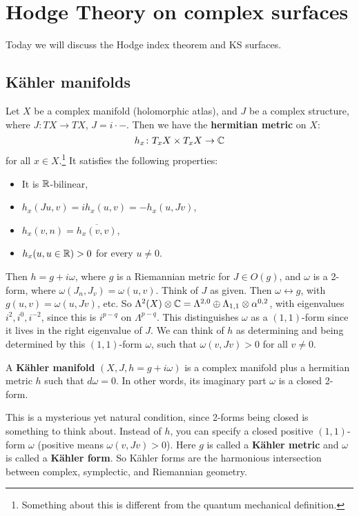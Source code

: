 \section{Hodge Theory on complex surfaces} 
Today we will discuss the Hodge index theorem and KS surfaces.
\subsection{K\"ahler manifolds}
Let $X$ be a complex manifold (holomorphic atlas), and $J$ be a complex structure, where $J \colon TX \to TX$, $J = i \cdot -$. Then we have the \textbf{hermitian metric} on $X:$ \[
h_x \colon T_x X \times T_x X \to \mathbb{C}
\] for all $x \in X$.\footnote{Something about this is different from the quantum mechanical definition.} It satisfies the following properties:
\begin{itemize}
\setlength\itemsep{-.2em}
    \item It is $\mathbb{R}$-bilinear,
    \item $h_x(Ju,v) = ih_x(u,v) = -h_x(u,Jv)$,
    \item $h_x(v,n) =  \overline{h_x(v,v)}$,
    \item $h_x(u,u \in \mathbb{R}) > 0$ for every $u \neq 0$.
\end{itemize}Then $h = g+ i\omega$, where $g$ is a Riemannian metric for $J \in O(g)$, and $\omega$ is a 2-form, where $\omega (J_n ,J_v) =  \omega(u,v)$. Think of $J$ as given. Then $\omega \leftrightarrow g$, with $g(u,v) =\omega (u, Jv)$, etc. So $\Lambda^2(X) \otimes \mathbb{C} = \Lambda^{2,0}\oplus \Lambda_{1,1}\otimes \alpha ^{0,2}$, with eigenvalues $i^2,i^0, i ^{-2}$, since this is $i ^{p-q}$ on $\Lambda^{p-q}$. This distinguishes $\omega$ as a $(1,1)$-form since it lives in the right eigenvalue of $J$. 
We can think of $h$ as determining and being determined by this $(1,1)$-form $\omega$, such that $\omega(v, Jv)>0$ for all $v\neq 0$.
\begin{definition}[]
    A \textbf{K\"ahler manifold} $(X,J,h = g+i \omega)$ is a complex manifold plus a hermitian metric $h$ such that $d\omega =0$. In other words, its imaginary part $\omega$ is a closed 2-form.    
\end{definition}
This is a mysterious yet natural condition, since 2-forms being closed is something to think about. Instead of $h$, you can specify a closed positive $(1,1)$-form $\omega$ (positive means $\omega(v,Jv) >0$). Here $g$ is called a \textbf{K\"ahler metric} and $\omega$ is called a \textbf{K\"ahler form}. So K\"ahler forms are the harmonious intersection between complex, symplectic, and Riemannian geometry.
